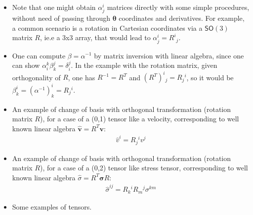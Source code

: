 \documentclass{digitaldynamics}
\def\vect#1{\bm{#1}}
\begin{document}
\begin{itemize}
	\item Note that one might obtain $\alpha^i_j$ matrices directly with some simple procedures, without need of passing through $\vect{\theta}$ coordinates and derivatives. For example, a common scenario is a rotation in Cartesian coordinates via a $\mathsf{SO}(3)$ matrix $R$, ie.e a 3x3 array, that would lead to $\alpha^i_j = R^i{}_j$. 
	
	\item One can compute $\beta=\alpha^{-1}$ by matrix inversion with linear algebra, since one can show $\alpha^k_i \beta^j_k = \delta^j_i$. 
	In the example with the rotation matrix, given orthogonality of $R$, one has $R^{-1} = R^{T}$ and  $(R^{T})^i{}_j = R_j{}^i$, so it would be $\beta^i_k = (\alpha^{-1})^i_k = R_j{}^i$.
	
	\item An example of change of basis with orthogonal transformation (rotation matrix $R$), for a case of a (0,1) tensor like a velocity, corresponding to well known linear algebra $\hat{\vect{v}} = R^{T} \vect{v}$: 
	\begin{align*}
  \hat{v}^{i} = R_j{}^i v^j
	\end{align*}
	
	\item An example of change of basis with orthogonal transformation (rotation matrix $R$), for a case of a (0,2) tensor like stress tensor, corresponding to well known linear algebra $\hat{\sigma} = R^{T} \vect{\sigma} R$:  
	\begin{align*}
  \hat{\sigma}^{ij} = R_k{}^i R_m{}^j  \sigma^{km}
	\end{align*}

	
	\item Some examples of tensors. 
	

\end{itemize}
\end{document}
